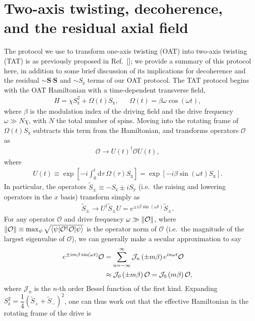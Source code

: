 \documentclass[aps,prx,superscriptaddress,twocolumn]{revtex4-2}
\newcommand{\f}[2]{\dfrac{#1}{#2}} %
\newcommand{\p}[1]{\left(#1\right)} %
\renewcommand{\sp}[1]{\left[#1\right]} %
\renewcommand{\c}{\cdot} %
\renewcommand{\d}{\text{d}} %
\renewcommand{\v}{\bm} %
\newcommand{\J}{\mathcal{J}}
\renewcommand{\O}{\mathcal{O}}
\newcommand{\z}{\text{z}}
\newcommand{\x}{\text{x}}
\newcommand{\y}{\text{y}}
\begin{document}
\section{Two-axis twisting, decoherence, and the residual axial field}
\label{sec:derivation_TAT}

The protocol we use to transform one-axis twisting (OAT) into two-axis twisting (TAT) is as previously proposed in Ref.~[]; we provide a summary of this protocol here, in addition to some brief discussion of its implications for decoherence and the residual $\sim\v S\v\c\v S$ and $\sim S_\z$ terms of our OAT protocol.
The TAT protocol begins with the OAT Hamiltonian with a time-dependent transverse field,
\begin{align}
  H = \chi S_\z^2 + \Omega\p{t} S_\x,
  &&
  \Omega\p{t} = \beta\omega \cos\p{\omega t},
  \label{eq:driven_OAT}
\end{align}
where $\beta$ is the modulation index of the driving field and the drive frequency $\omega\gg N\chi$, with $N$ the total number of spins.
Moving into the rotating frame of $\Omega\p{t}S_\x$ subtracts this term from the Hamiltonian, and transforms operators $\O$ as
\begin{align}
  \O \to U\p{t}^\dag \O U\p{t},
\end{align}
where
\begin{align}
  U\p{t} \equiv \exp\sp{-i\int_0^t\d\tau~\Omega\p{\tau}S_\x}
  = \exp\sp{-i\beta\sin\p{\omega t}S_\x}.
\end{align}
In particular, the operators $\tilde S_\pm\equiv-S_\z\pm iS_\y$ (i.e.~the raising and lowering operators in the $x$ basis) transform simply as
\begin{align}
  \tilde S_\pm
  \to U^\dag \tilde S_\pm U
  = e^{\pm i\beta\sin\p{\omega t}} \tilde S_\pm.
\end{align}
For any operator $\O$ and drive frequency $\omega\gg\norm{\O}$, where $\norm{\O}\equiv\max_\psi\sqrt{\braket{\psi|\O^\dag\O|\psi}}$ is the operator norm of $\O$ (i.e.~the magnitude of the largest eigenvalue of $\O$), we can generally make a secular approximation to say
\begin{align}
  e^{\pm im\beta\sin\p{\omega t}} \O
  &= \sum_{n=-\infty}^\infty \J_n\p{\pm m\beta} e^{in\omega t} \O \notag \\
  &\approx \J_0\p{\pm m\beta} \O
  = \J_0\p{m\beta} \O,
\end{align}
where $\J_n$ is the $n$-th order Bessel function of the first kind.
Expanding $S_\z^2=\f14\p{\tilde S_+ + \tilde S_-}^2$, one can thus work out that the effective Hamiltonian in the rotating frame of the drive is
\end{document}
